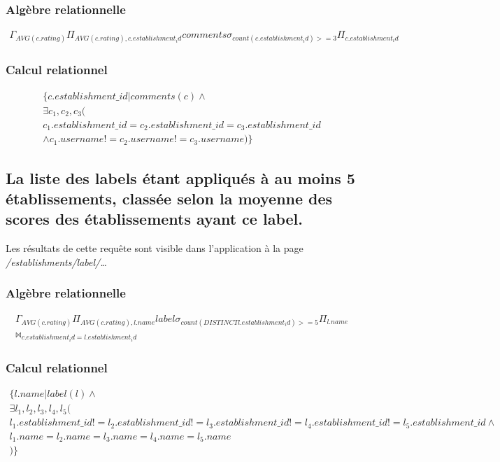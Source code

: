 \documentclass[a4paper,10pt]{article}
\begin{document}
\subsubsection{Algèbre relationnelle}
\begin{align}
    \Gamma_{AVG(c.rating)}\Pi_{AVG(c.rating), c.establishment_id}comments \sigma_{count(c.establishment_id)>=3}\Pi_{c.establishment_id}
\end{align}

\subsubsection{Calcul relationnel}
\begin{align}
    \{ c.establishment\_id | comments(c) \wedge \\
    \exists c_1, c_2, c_3 ( \\
        c_1.establishment\_id = c_2.establishment\_id = c_3.establishment\_id \\
        \wedge c_1.username != c_2.username != c_3.username
    ) \}
\end{align}


\subsection{La liste des labels étant appliqués à au moins 5 établissements,
classée selon la moyenne des scores des établissements ayant ce label.}
    Les résultats de cette requête sont visible dans l'application à la page
    \emph{/establishments/label/\ldots}
    

\subsubsection{Algèbre relationnelle}
    \begin{align}
        \Gamma_{AVG(c.rating)}\Pi_{AVG(c.rating), l.name}label \sigma_{count(DISTINCT l.establishment_id)>=5}\Pi_{l.name}
        \\\bowtie_{c.establishment_id=l.establishment_id}
    \end{align}

\subsubsection{Calcul relationnel}
\begin{align}
    \{ l.name | label(l) \wedge \\
    \exists l_1, l_2, l_3, l_4, l_5 ( \\
        l_1.establishment\_id != l_2.establishment\_id != l_3.establishment\_id != l_4.establishment\_id != l_5.establishment\_id\wedge \\
        l_1.name = l_2.name = l_3.name = l_4.name = l_5.name \\
    ) \}
\end{align}
\end{document}
